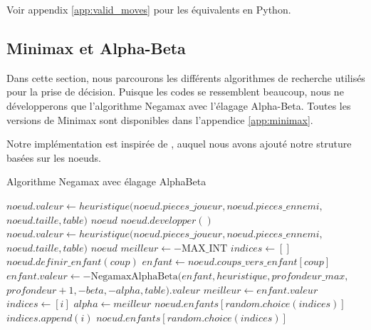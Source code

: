 Voir appendix \ref{app:valid_moves} pour les équivalents en Python.

\subsection{Minimax et Alpha-Beta}
\label{subsec:minimax}
Dans cette section, nous parcourons les différents algorithmes de recherche utilisés pour la prise de décision. Puisque les codes se ressemblent beaucoup, nous ne développerons que l'algorithme Negamax avec l'élagage Alpha-Beta. Toutes les versions de Minimax sont disponibles dans l'appendice \ref{app:minimax}.

Notre implémentation est inspirée de \cite{optimisations}, auquel nous avons ajouté notre struture basées sur les noeuds.

\begin{algorithm}[H]
    \caption{Algorithme Negamax avec élagage AlphaBeta}
    \begin{algorithmic}[1]
            \State $noeud.valeur \gets heuristique(noeud.pieces\_joueur, noeud.pieces\_ennemi, $ \Statex \hspace{1\algorithmicindent} $noeud.taille, table)$
            \State \Return $noeud$
        \EndIf
            \State $noeud.developper()$
        \EndIf
            \State $noeud.valeur \gets heuristique(noeud.pieces\_joueur, noeud.pieces\_ennemi, $ \Statex \hspace{1\algorithmicindent} $noeud.taille, table)$
            \State \Return $noeud$
        \EndIf
        \State $meilleur \gets -\text{MAX\_INT}$
        \State $indices \gets []$
                \State $noeud.definir\_enfant(coup)$
            \EndIf
            \State $enfant \gets noeud.coups\_vers\_enfant[coup]$
            \State $enfant.valeur \gets -\text{NegamaxAlphaBeta}(enfant, heuristique, profondeur\_max, $ \Statex \hspace{1\algorithmicindent} $profondeur + 1, -beta, -alpha, table).valeur$
                \State $meilleur \gets enfant.valeur$
                \State $indices \gets [i]$
                    \State $alpha \gets meilleur$
                        \State \Return $noeud.enfants[random.choice(indices)]$
                    \EndIf
                \EndIf
                \State $indices.append(i)$
            \EndIf
        \EndFor
        \State \Return $noeud.enfants[random.choice(indices)]$
    \EndFunction
    \end{algorithmic}
\end{algorithm}

